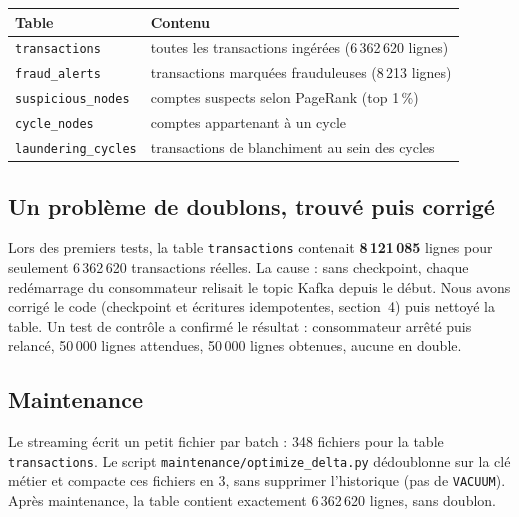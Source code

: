 \documentclass[11pt,a4paper]{article}
\begin{document}
\begin{center}
\small
\begin{tabular}{@{}lp{9.5cm}@{}}
\toprule
\textbf{Table} & \textbf{Contenu} \\
\midrule
\texttt{transactions} & toutes les transactions ing\'er\'ees (6\,362\,620 lignes) \\
\texttt{fraud\_alerts} & transactions marqu\'ees frauduleuses (8\,213 lignes) \\
\texttt{suspicious\_nodes} & comptes suspects selon PageRank (top 1\,\%) \\
\texttt{cycle\_nodes} & comptes appartenant \`a un cycle \\
\texttt{laundering\_cycles} & transactions de blanchiment au sein des cycles \\
\bottomrule
\end{tabular}
\end{center}

\subsection{Un probl\`eme de doublons, trouv\'e puis corrig\'e}
Lors des premiers tests, la table \texttt{transactions} contenait \textbf{8\,121\,085} lignes pour seulement 6\,362\,620 transactions r\'eelles. La cause : sans checkpoint, chaque red\'emarrage du consommateur relisait le topic Kafka depuis le d\'ebut. Nous avons corrig\'e le code (checkpoint et \'ecritures idempotentes, section~4) puis nettoy\'e la table. Un test de contr\^ole a confirm\'e le r\'esultat : consommateur arr\^et\'e puis relanc\'e, 50\,000 lignes attendues, 50\,000 lignes obtenues, aucune en double.

\subsection{Maintenance}
Le streaming \'ecrit un petit fichier par batch : 348 fichiers pour la table \texttt{transactions}. Le script \texttt{maintenance/optimize\_delta.py} d\'edoublonne sur la cl\'e m\'etier et compacte ces fichiers en 3, sans supprimer l'historique (pas de \texttt{VACUUM}). Apr\`es maintenance, la table contient exactement 6\,362\,620 lignes, sans doublon.

\end{document}
